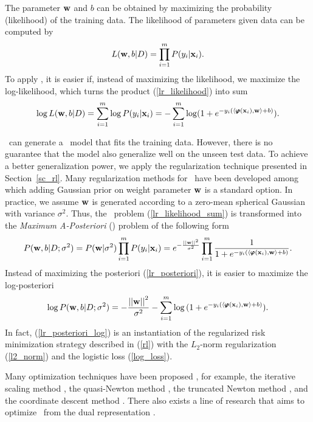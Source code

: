 {%
The parameter $\mathbf {w}$ and $b$ can be obtained by maximizing the probability (likelihood) of the training data.
The likelihood of parameters given data can be computed by
\begin{align}
	L(\mathbf {w},b|D) = \prod_{i=1}^mP(y_i|\mathbf {x}_i). \label{lr_likelihood}
\end{align}
To apply \mle, it is easier if, instead of maximizing the likelihood, we maximize the log-likelihood, which turns the product (\ref{lr_likelihood}) into sum
\begin{align}
	\log L(\mathbf {w},b|D) = \sum_{i=1}^{m}\log P(y_i|\mathbf {x}_i) = -\sum_{i=1}^{m}\log (1+e^{ -y_i(\langle \pmb \varphi(\mathbf {x}_i), \mathbf {w} \rangle+b) }) \label{lr_likelihood_sum}.
\end{align}

\mle\ can generate a \lr\ model that fits the training data.
However, there is no guarantee that the model also generalize well on the unseen test data.
To achieve a better generalization power, we apply the regularization technique presented in Section~\ref{sc_rl}.
Many regularization methods for \lr\ have been developed \citep{Chen99,Chen00,Goodman03} among which adding Gaussian prior on weight parameter $\mathbf {w}$ is a standard option.
In practice, we assume $\mathbf {w}$ is generated according to a zero-mean spherical Gaussian with variance $\sigma^2$.
Thus, the \mle\ problem (\ref{lr_likelihood_sum}) is transformed into the \textit{Maximum A-Posteriori} (\map) problem of the following form
\begin{align}
	P(\mathbf {w},b|D;\sigma^2) = P(\mathbf {w}|\sigma^2)\prod_{i=1}^mP(y_i|\mathbf {x}_i)=e^{ -\frac{\left|\left| \mathbf {w} \right|\right|^2}{\sigma^2} }\prod_{i=1}^{m}{\frac{1}{1+e^{ -y_i(\langle \pmb \varphi(\mathbf {x}_i), \mathbf {w} \rangle+b) }}}. \label{lr_posteriori}
\end{align}
Instead of maximizing the posteriori (\ref{lr_posteriori}), it is easier to maximize the log-posteriori
\begin{align}
	\log P(\mathbf {w},b|D;\sigma^2) = -{\frac{\left|\left| \mathbf {w} \right|\right|^2}{\sigma^2}} - \sum_{i=1}^{m}\log{(1+e^{ -y_i(\langle \pmb \varphi(\mathbf {x}_i), \mathbf {w}\rangle+b) })}. \label{lr_posteriori_log}
\end{align}
In fact, (\ref{lr_posteriori_log}) is an instantiation of the regularized risk minimization strategy described in (\ref{rl}) with the $L_2$-norm regularization (\ref{l2_norm}) and the logistic loss (\ref{log_loss}).

Many optimization techniques have been proposed \citep{Minka03}, for example, 
the {iterative scaling} method \citep{Darroch72,Pietra97inducing,Berger97,Goodman02Sequential,Jin03a},
the quasi-Newton method \citep{Minka03},
the truncated Newton method \citep{Komarek05making,Lin2008trust},
and the coordinate descent method \citep{Huang09iterative}.
There also exists a line of research that aims to optimize \lr\ from the dual representation \citep{Jaakkola99probabilistic,Keerthi05a,Yu11dual}.




}
